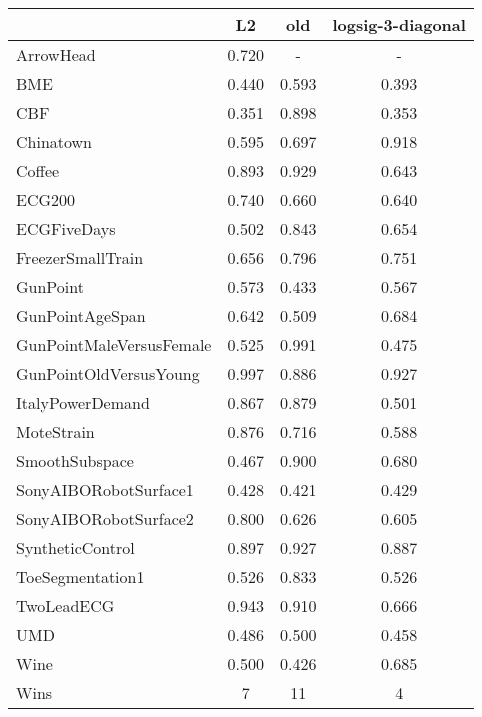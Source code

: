 \begin{tabular}{lccc}
\toprule
{} &    L2 &   old &  logsig-3-diagonal \\
\midrule
ArrowHead                & 0.720 &     - &                  - \\
BME                      & 0.440 & 0.593 &              0.393 \\
CBF                      & 0.351 & 0.898 &              0.353 \\
Chinatown                & 0.595 & 0.697 &              0.918 \\
Coffee                   & 0.893 & 0.929 &              0.643 \\
ECG200                   & 0.740 & 0.660 &              0.640 \\
ECGFiveDays              & 0.502 & 0.843 &              0.654 \\
FreezerSmallTrain        & 0.656 & 0.796 &              0.751 \\
GunPoint                 & 0.573 & 0.433 &              0.567 \\
GunPointAgeSpan          & 0.642 & 0.509 &              0.684 \\
GunPointMaleVersusFemale & 0.525 & 0.991 &              0.475 \\
GunPointOldVersusYoung   & 0.997 & 0.886 &              0.927 \\
ItalyPowerDemand         & 0.867 & 0.879 &              0.501 \\
MoteStrain               & 0.876 & 0.716 &              0.588 \\
SmoothSubspace           & 0.467 & 0.900 &              0.680 \\
SonyAIBORobotSurface1    & 0.428 & 0.421 &              0.429 \\
SonyAIBORobotSurface2    & 0.800 & 0.626 &              0.605 \\
SyntheticControl         & 0.897 & 0.927 &              0.887 \\
ToeSegmentation1         & 0.526 & 0.833 &              0.526 \\
TwoLeadECG               & 0.943 & 0.910 &              0.666 \\
UMD                      & 0.486 & 0.500 &              0.458 \\
Wine                     & 0.500 & 0.426 &              0.685 \\ 
\midrule
Wins &   7 &   11 &                  4 \\
\bottomrule
\end{tabular}
